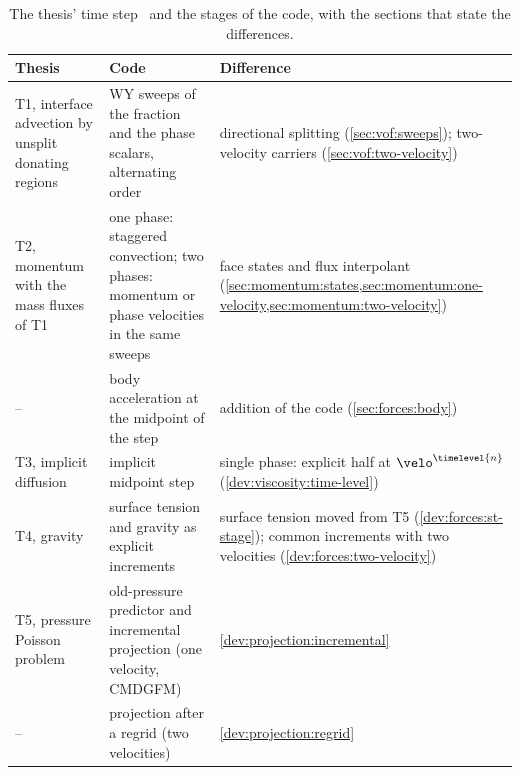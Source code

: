 \begin{table}[tbp]
  \centering\footnotesize
  \caption{The thesis' time step~ and the stages of the code,
    with the sections that state the differences.}
  \label{tab:overview:thesis}
  \begin{tabular}{@{}>{\raggedright}p{2.9cm}>{\raggedright}p{4.5cm}>{\raggedright\arraybackslash}p{4.6cm}@{}}
    \toprule
    Thesis & Code & Difference\\
    \midrule
    T1, interface advection by unsplit donating regions
      & WY sweeps of the fraction and the phase scalars, alternating order
      & directional splitting (\cref{sec:vof:sweeps}); two-velocity carriers (\cref{sec:vof:two-velocity})\\
    T2, momentum with the mass fluxes of T1
      & one phase: staggered convection; two phases: momentum or phase velocities in the same sweeps
      & face states and flux interpolant (\cref{sec:momentum:states,sec:momentum:one-velocity,sec:momentum:two-velocity})\\
    --
      & body acceleration at the midpoint of the step
      & addition of the code (\cref{sec:forces:body})\\
    T3, implicit diffusion
      & implicit midpoint step
      & single phase: explicit half at $\velo^{\timelevel{n}}$ (\cref{dev:viscosity:time-level})\\
    T4, gravity
      & surface tension and gravity as explicit increments
      & surface tension moved from T5 (\cref{dev:forces:st-stage}); common increments with two velocities (\cref{dev:forces:two-velocity})\\
    T5, pressure Poisson problem
      & old-pressure predictor and incremental projection (one velocity, CMDGFM)
      & \cref{dev:projection:incremental}\\
    --
      & projection after a regrid (two velocities)
      & \cref{dev:projection:regrid}\\
    \bottomrule
  \end{tabular}
\end{table}

